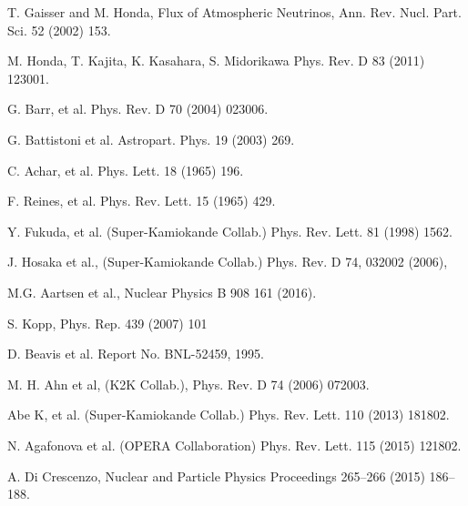 \documentclass[preprint,12pt]{elsarticle}
\begin{document}


\begin{thebibliography}{00}


T. Gaisser and M. Honda, Flux of Atmospheric Neutrinos, Ann. Rev. Nucl. Part. Sci. 52 (2002) 153.

M. Honda, T. Kajita, K. Kasahara, S. Midorikawa  Phys. Rev. D 83 (2011) 123001. 

G. Barr, et al. Phys. Rev. D 70 (2004) 023006.

G. Battistoni et al. Astropart. Phys. 19 (2003) 269.

C. Achar, et al. Phys. Lett. 18 (1965) 196.

F. Reines, et al. Phys. Rev. Lett. 15 (1965) 429.

Y. Fukuda, et al. (Super-Kamiokande Collab.) Phys. Rev. Lett. 81 (1998) 1562.

J. Hosaka et al., (Super-Kamiokande Collab.) Phys. Rev. D 74, 032002 (2006),


M.G. Aartsen et al., Nuclear Physics B 908  161 (2016).

S. Kopp, Phys. Rep. 439 (2007) 101

D. Beavis et al. 
Report No. BNL-52459, 1995.

M. H. Ahn et al, (K2K Collab.), Phys. Rev. D 74 (2006) 072003. 

Abe K, et al. (Super-Kamiokande Collab.) Phys. Rev. Lett. 110 (2013) 181802.

N. Agafonova et al. (OPERA Collaboration)
Phys. Rev. Lett. 115 (2015) 121802.

A. Di Crescenzo, Nuclear and Particle Physics Proceedings 265–266 (2015) 186–188.

\end{thebibliography}
\end{document}
